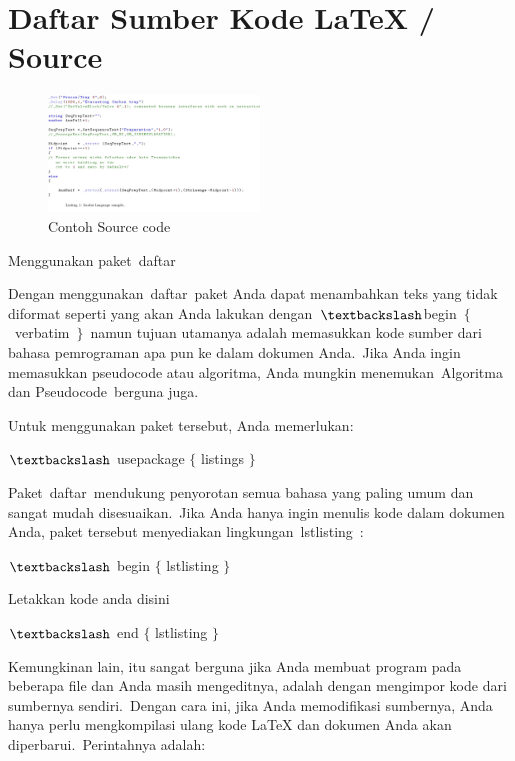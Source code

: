 \sloppy
\section{Daftar Sumber Kode LaTeX / Source}

\begin{figure}[ht]
	\centerline{\includegraphics[width=0.50\textwidth]{gambar/contoh1}}
	\caption{Contoh Source code}
	\label{contoh}
\end{figure}

Menggunakan paket daftar \par

Dengan menggunakan daftar paket Anda dapat menambahkan teks yang tidak diformat seperti yang akan Anda lakukan dengan $\textbackslash$begin $ \{ $ verbatim $ \} $ namun tujuan utamanya adalah memasukkan kode sumber dari bahasa pemrograman apa pun ke dalam dokumen Anda. Jika Anda ingin memasukkan pseudocode atau algoritma, Anda mungkin menemukan Algoritma dan Pseudocode berguna juga.\par

Untuk menggunakan paket tersebut, Anda memerlukan:\par

$\textbackslash$ usepackage $ \{ $ listings $ \} $\par

Paket daftar mendukung penyorotan semua bahasa yang paling umum dan sangat mudah disesuaikan. Jika Anda hanya ingin menulis kode dalam dokumen Anda, paket tersebut menyediakan lingkungan lstlisting :\par

$\textbackslash$ begin $ \{ $ lstlisting $ \} $\par

 Letakkan kode anda disini\par

 $\textbackslash$ end $ \{ $ lstlisting $ \} $\par

Kemungkinan lain, itu sangat berguna jika Anda membuat program pada beberapa file dan Anda masih mengeditnya, adalah dengan mengimpor kode dari sumbernya sendiri. Dengan cara ini, jika Anda memodifikasi sumbernya, Anda hanya perlu mengkompilasi ulang kode LaTeX dan dokumen Anda akan diperbarui. Perintahnya adalah:\par

